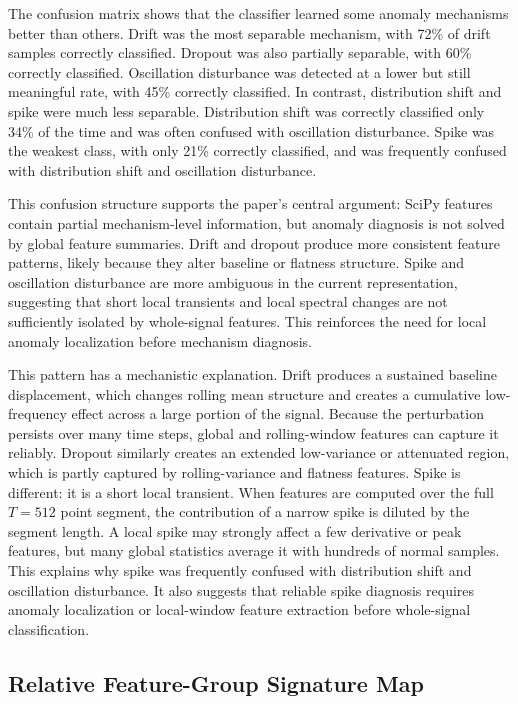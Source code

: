 The confusion matrix shows that the classifier learned some anomaly mechanisms better than others. Drift was the most separable mechanism, with 72\% of drift samples correctly classified. Dropout was also partially separable, with 60\% correctly classified. Oscillation disturbance was detected at a lower but still meaningful rate, with 45\% correctly classified. In contrast, distribution shift and spike were much less separable. Distribution shift was correctly classified only 34\% of the time and was often confused with oscillation disturbance. Spike was the weakest class, with only 21\% correctly classified, and was frequently confused with distribution shift and oscillation disturbance.

This confusion structure supports the paper's central argument: SciPy features contain partial mechanism-level information, but anomaly diagnosis is not solved by global feature summaries. Drift and dropout produce more consistent feature patterns, likely because they alter baseline or flatness structure. Spike and oscillation disturbance are more ambiguous in the current representation, suggesting that short local transients and local spectral changes are not sufficiently isolated by whole-signal features. This reinforces the need for local anomaly localization before mechanism diagnosis.

This pattern has a mechanistic explanation. Drift produces a sustained baseline displacement, which changes rolling mean structure and creates a cumulative low-frequency effect across a large portion of the signal. Because the perturbation persists over many time steps, global and rolling-window features can capture it reliably. Dropout similarly creates an extended low-variance or attenuated region, which is partly captured by rolling-variance and flatness features. Spike is different: it is a short local transient. When features are computed over the full \(T=512\) point segment, the contribution of a narrow spike is diluted by the segment length. A local spike may strongly affect a few derivative or peak features, but many global statistics average it with hundreds of normal samples. This explains why spike was frequently confused with distribution shift and oscillation disturbance. It also suggests that reliable spike diagnosis requires anomaly localization or local-window feature extraction before whole-signal classification.

\subsection{Relative Feature-Group Signature Map}

